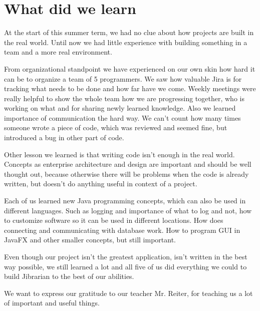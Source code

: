 \documentclass[11pt,twoside,a4paper]{article}
\begin{document}
\section{What did we learn}

At the start of this summer term, we had no clue about how projects are built
in the real world. Until now we had little experience with building something
in a team and a more real environment.

From organizational standpoint we have experienced on our own skin how hard it
can be to organize a team of 5 programmers. We saw how valuable Jira is for
tracking what needs to be done and how far have we come. Weekly meetings were
really helpful to show the whole team how we are progressing together, who is
working on what and for sharing newly learned knowledge. Also we learned
importance of communication the hard way. We can't count how many times someone
wrote a piece of code, which was reviewed and seemed fine, but introduced
a bug in other part of code.

Other lesson we learned is that writing code isn't enough in the real world.
Concepts as enterprise architecture and design are important and should be well
thought out, because otherwise there will be problems when the code is already
written, but doesn't do anything useful in context of a project.

Each of us learned new Java programming concepts, which can also be used in
different languages. Such as logging and importance of what to log and not,
how to customize software so it can be used in different locations. How does
connecting and communicating with database work. How to program GUI in JavaFX
and other smaller concepts, but still important.

Even though our project isn't the greatest application, isn't written in
the best way possible, we still learned a lot and all five of us did everything
we could to build Jibrarian to the best of our abilities.

We want to express our gratitude to our teacher Mr. Reiter, for teaching us a lot
of important and useful things.



\end{document}
